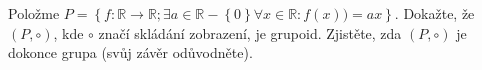 Položme $P=\left \{f:\mathbb{R}\rightarrow \mathbb{R}; \exists a
\in\mathbb{R}-\left \{ 0 \right \} \forall x \in \mathbb{R} : f(x)) = ax\right
\}$. Dokažte, že $(P,\circ)$, kde $\circ$ značí skládání zobrazení, je grupoid.
Zjistěte, zda $(P,\circ)$ je dokonce grupa (svůj závěr odůvodněte).
